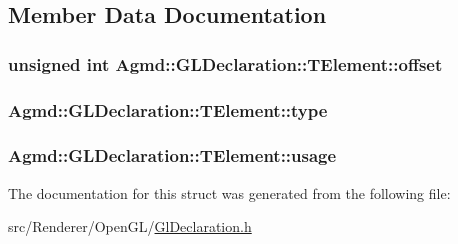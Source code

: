 \subsection{Member Data Documentation}
\hypertarget{struct_agmd_1_1_g_l_declaration_1_1_t_element_aca50cf0d3e49cd4b2b769aa00b08e2dc}{
\subsubsection[{offset}]{\setlength{\rightskip}{0pt plus 5cm}unsigned int Agmd\+::\+G\+L\+Declaration\+::\+T\+Element\+::offset}}\label{struct_agmd_1_1_g_l_declaration_1_1_t_element_aca50cf0d3e49cd4b2b769aa00b08e2dc}
\hypertarget{struct_agmd_1_1_g_l_declaration_1_1_t_element_a8f24568d3013aa7499676a1528470462}{
\subsubsection[{type}]{ Agmd\+::\+G\+L\+Declaration\+::\+T\+Element\+::type}}\label{struct_agmd_1_1_g_l_declaration_1_1_t_element_a8f24568d3013aa7499676a1528470462}
\hypertarget{struct_agmd_1_1_g_l_declaration_1_1_t_element_a796bbcb9bce6a238d006fefa1d001aee}{
\subsubsection[{usage}]{ Agmd\+::\+G\+L\+Declaration\+::\+T\+Element\+::usage}}\label{struct_agmd_1_1_g_l_declaration_1_1_t_element_a796bbcb9bce6a238d006fefa1d001aee}


The documentation for this struct was generated from the following file\+:\begin{DoxyCompactItemize}
\item 
src/\+Renderer/\+Open\+G\+L/\hyperlink{_gl_declaration_8h}{Gl\+Declaration.\+h}\end{DoxyCompactItemize}
